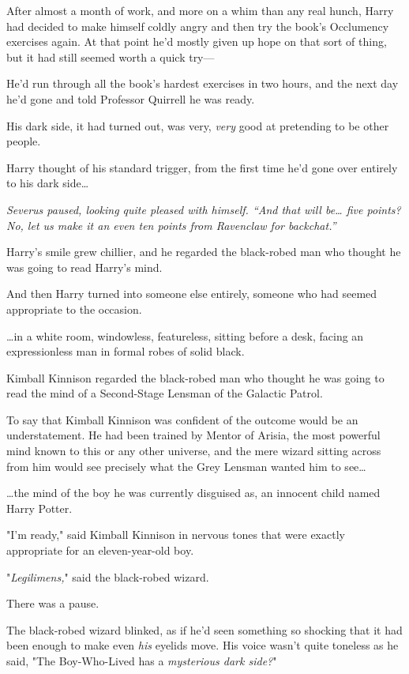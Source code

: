 After almost a month of work, and more on a whim than any real hunch, Harry had
decided to make himself coldly angry and then try the book's Occlumency
exercises again. At that point he'd mostly given up hope on that sort of thing,
but it had still seemed worth a quick try---

He'd run through all the book's hardest exercises in two hours, and the next
day he'd gone and told Professor Quirrell he was ready.

His dark side, it had turned out, was very, \emph{very} good at pretending to
be other people.

Harry thought of his standard trigger, from the first time he'd gone over
entirely to his dark side{\ldots}

\emph{Severus paused, looking quite pleased with himself. ``And that will
be{\ldots} five points? No, let us make it an even ten points from Ravenclaw
for backchat.''}

Harry's smile grew chillier, and he regarded the black-robed man who thought he
was going to read Harry's mind.

And then Harry turned into someone else entirely, someone who had seemed
appropriate to the occasion.

{\ldots}in a white room, windowless, featureless, sitting before a desk, facing
an expressionless man in formal robes of solid black.

Kimball Kinnison regarded the black-robed man who thought he was going to read
the mind of a Second-Stage Lensman of the Galactic Patrol.

To say that Kimball Kinnison was confident of the outcome would be an
understatement. He had been trained by Mentor of Arisia, the most powerful mind
known to this or any other universe, and the mere wizard sitting across from
him would see precisely what the Grey Lensman wanted him to see{\ldots}

{\ldots}the mind of the boy he was currently disguised as, an innocent child
named Harry Potter.

"I'm ready," said Kimball Kinnison in nervous tones that were exactly
appropriate for an eleven-year-old boy.

"\emph{Legilimens,}" said the black-robed wizard.

There was a pause.

The black-robed wizard blinked, as if he'd seen something so shocking that it
had been enough to make even \emph{his} eyelids move. His voice wasn't quite
toneless as he said, "The Boy-Who-Lived has a \emph{mysterious dark side?}"

